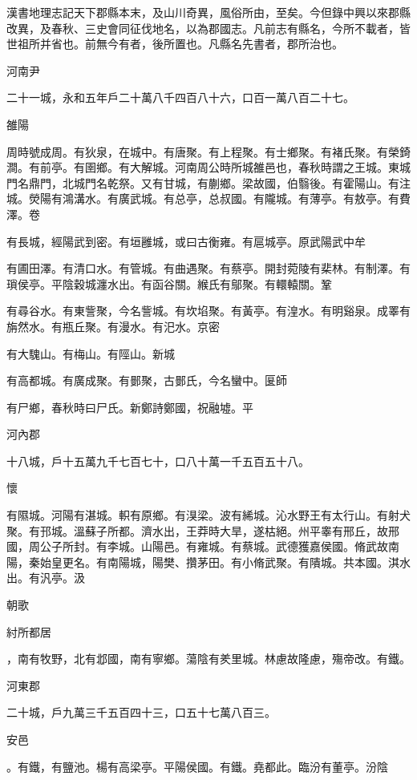 
\begin{pinyinscope}
漢書地理志記天下郡縣本末，及山川奇異，風俗所由，至矣。今但錄中興以來郡縣改異，及春秋、三史會同征伐地名，以為郡國志。凡前志有縣名，今所不載者，皆世祖所并省也。前無今有者，後所置也。凡縣名先書者，郡所治也。

河南尹

二十一城，永和五年戶二十萬八千四百八十六，口百一萬八百二十七。

雒陽

周時號成周。有狄泉，在城中。有唐聚。有上程聚。有士鄉聚。有褚氏聚。有榮錡澗。有前亭。有圉鄉。有大解城。河南周公時所城雒邑也，春秋時謂之王城。東城門名鼎門，北城門名乾祭。又有甘城，有蒯鄉。梁故國，伯翳後。有霍陽山。有注城。熒陽有鴻溝水。有廣武城。有总亭，总叔國。有隴城。有薄亭。有敖亭。有費澤。卷

有長城，經陽武到密。有垣雝城，或曰古衡雍。有扈城亭。原武陽武中牟

有圃田澤。有清口水。有管城。有曲遇聚。有蔡亭。開封菀陵有棐林。有制澤。有瑣侯亭。平陰穀城瀍水出。有函谷關。緱氏有鄔聚。有轘轅關。鞏

有尋谷水。有東訾聚，今名訾城。有坎埳聚。有黃亭。有湟水。有明谿泉。成睪有旃然水。有瓶丘聚。有漫水。有汜水。京密

有大騩山。有梅山。有陘山。新城

有高都城。有廣成聚。有鄤聚，古鄤氏，今名蠻中。匽師

有尸鄉，春秋時曰尸氏。新鄭詩鄭國，祝融墟。平

河內郡

十八城，戶十五萬九千七百七十，口八十萬一千五百五十八。

懷

有隰城。河陽有湛城。軹有原鄉。有湨梁。波有絺城。沁水野王有太行山。有射犬聚。有邘城。溫蘇子所都。濟水出，王莽時大旱，遂枯絕。州平睾有邢丘，故邢國，周公子所封。有李城。山陽邑。有雍城。有蔡城。武德獲嘉侯國。脩武故南陽，秦始皇更名。有南陽城，陽樊、攢茅田。有小脩武聚。有隤城。共本國。淇水出。有汎亭。汲

朝歌

紂所都居

，南有牧野，北有邶國，南有寧鄉。蕩陰有羑里城。林慮故隆慮，殤帝改。有鐵。

河東郡

二十城，戶九萬三千五百四十三，口五十七萬八百三。

安邑

。有鐵，有鹽池。楊有高梁亭。平陽侯國。有鐵。堯都此。臨汾有董亭。汾陰


\end{pinyinscope}
